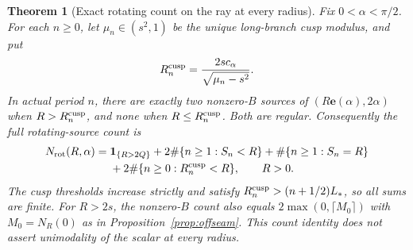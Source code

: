 \documentclass[11pt,a4paper]{article}
\newtheorem{theorem}{Theorem}[section]
\theoremstyle{remark}\newtheorem{remark}[theorem]{Remark}
\newcommand{\ind}{\mathbf{1}}
\newcommand{\ee}{\mathbf e}
\begin{document}
\begin{theorem}[Exact rotating count on the ray at every radius]
\label{thm:ray-all-radii}
Fix $0<\alpha<\pi/2$. For each $n\ge0$, let
$\mu_n\in(s^2,1)$ be the unique long-branch cusp modulus, and put
\[
 R_n^{\rm cusp}=\frac{2sc_\alpha}{\sqrt{\mu_n-s^2}}.
\]
In actual period $n$, there are exactly two nonzero-$B$ sources of
$(R\ee(\alpha),2\alpha)$ when $R>R_n^{\rm cusp}$, and none
when $R\le R_n^{\rm cusp}$. Both are regular. Consequently the
full rotating-source count is
\begin{equation}\label{eq:ray-global-count}
 \begin{aligned}
 N_{\rm rot}(R,\alpha)
 ={}&\ind_{\{R>2Q\}}
   +2\#\{n\ge1:S_n<R\}+\#\{n\ge1:S_n=R\}\\
   &+2\#\{n\ge0:R_n^{\rm cusp}<R\},\qquad R>0.
 \end{aligned}
\end{equation}
The cusp thresholds increase strictly and satisfy
$R_n^{\rm cusp}>(n+1/2)L_*$, so all sums are finite.
For $R>2s$, the nonzero-$B$ count also equals
$2\max(0,\lceil M_0\rceil)$ with $M_0=N_R(0)$ as in
Proposition~\ref{prop:offseam}. This count identity does not assert
unimodality of the scalar at every radius.
\end{theorem}
\end{document}
